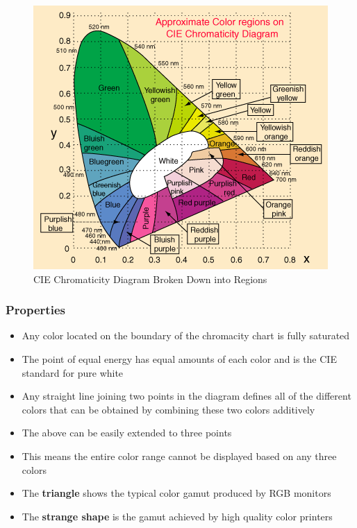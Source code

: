 \begin{figure}[H]
  \centering
  \includegraphics[width=0.8\linewidth]{images/cie_chromaticity_diagram.png}
  \caption{CIE Chromaticity Diagram Broken Down into Regions}
\end{figure}

\subsubsection*{Properties}

\begin{itemize}
  \item Any color located on the boundary of the chromacity chart is
    fully saturated
  \item The point of equal energy has equal amounts of each color
    and is the CIE standard for pure white
  \item Any straight line joining two points in the diagram defines
    all of the different colors that can be obtained by combining
    these two colors additively
  \item The above can be easily extended to three points
  \item This means the entire color range cannot be displayed based
    on any three colors
  \item The \textbf{triangle} shows the typical color gamut produced
    by RGB monitors
  \item The \textbf{strange shape} is the gamut achieved by high
    quality color printers
\end{itemize}

